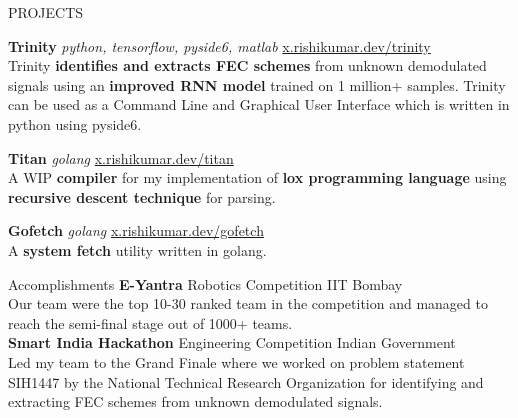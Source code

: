 \documentclass{resume} %
\begin{document}
	\begin{rSection}{PROJECTS}
		\vspace{-1.25em}
		\item \textbf{Trinity} \textit{python, tensorflow, pyside6, matlab} \hfill {\href{https://x.rishikumar.dev/trinity}{x.rishikumar.dev/trinity}}\\
			{Trinity \textbf{identifies and extracts FEC schemes} from unknown demodulated signals using an \textbf{improved RNN model} trained on 1 million+ samples. Trinity can be used as a Command Line and Graphical User Interface which is written in python using pyside6.}
		\item \textbf{Titan} \textit{golang} \hfill {\href{https://x.rishikumar.dev/titan}{x.rishikumar.dev/titan}}\\
			{A WIP \textbf{compiler} for my implementation of \textbf{lox programming language} using \textbf{recursive descent technique}  for parsing.}
		\item \textbf{Gofetch} \textit{golang} \hfill {\href{https://x.rishikumar.dev/gofetch}{x.rishikumar.dev/gofetch}}\\
			{A \textbf{system fetch} utility written in golang.}
	\end{rSection} 


	
	\begin{rSection}{Accomplishments} 
		\textbf{E-Yantra} {Robotics Competition} \hfill IIT Bombay\\
		{Our team were the top 10-30 ranked team in the competition and managed to reach the semi-final stage out of 1000+ teams.}\\	
		\textbf{Smart India Hackathon} {Engineering Competition} \hfill Indian Government\\
		{Led my team to the Grand Finale where we worked on problem statement SIH1447 by the National
Technical Research Organization for identifying and extracting FEC schemes from unknown demodulated signals.} 	
	\end{rSection}
\end{document}
